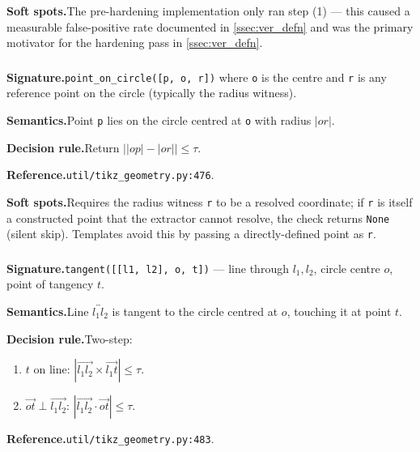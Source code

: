 \noindent\textbf{Soft spots.}\quad The pre-hardening implementation only ran step (1) --- this caused a measurable false-positive rate documented in \cref{ssec:ver_defn} and was the primary motivator for the hardening pass in \cref{ssec:ver_defn}.

\subsubsection{}
\label{app:pred:point_on_circle}

\noindent\textbf{Signature.}\quad \texttt{point\_on\_circle([p, o, r])} where \texttt{o} is the centre and \texttt{r} is any reference point on the circle (typically the radius witness).

\noindent\textbf{Semantics.}\quad Point \texttt{p} lies on the circle centred at \texttt{o} with radius $|or|$.

\noindent\textbf{Decision rule.}\quad Return $\big||op| - |or|\big| \leq \tau$.

\noindent\textbf{Reference.}\quad \texttt{util/tikz\_geometry.py:476}.

\noindent\textbf{Soft spots.}\quad Requires the radius witness \texttt{r} to be a resolved coordinate; if \texttt{r} is itself a constructed point that the extractor cannot resolve, the check returns \texttt{None} (silent skip). Templates avoid this by passing a directly-defined point as \texttt{r}.

\subsubsection{}
\label{app:pred:tangent}

\noindent\textbf{Signature.}\quad \texttt{tangent([[l1, l2], o, t])} --- line through $l_1, l_2$, circle centre $o$, point of tangency $t$.

\noindent\textbf{Semantics.}\quad Line $\overleftrightarrow{l_1 l_2}$ is tangent to the circle centred at $o$, touching it at point $t$.

\noindent\textbf{Decision rule.}\quad Two-step:
\begin{enumerate}
\item $t$ on line: $|\vec{l_1 l_2}\times\vec{l_1 t}| \leq \tau$.
\item $\vec{ot} \perp \vec{l_1 l_2}$: $|\vec{l_1 l_2}\cdot\vec{ot}| \leq \tau$.
\end{enumerate}

\noindent\textbf{Reference.}\quad \texttt{util/tikz\_geometry.py:483}.

